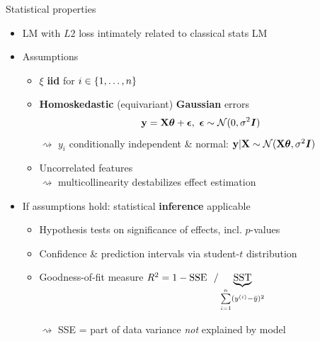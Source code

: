 \documentclass[11pt,compress,t,notes=noshow, xcolor=table]{beamer}
\begin{document}

\begin{vbframe}{Statistical properties}

\begin{itemize}
    \item LM with $L2$ loss intimately related to classical stats LM
    \item Assumptions
    \begin{itemize}
        \item $\xi$ \textbf{iid} for $i \in \{1, \ldots, n\}$
        \item \textbf{Homoskedastic} (equivariant) 
         \textbf{Gaussian} errors
        $$\mathbf{y} = \mathbf{X} \bm{\theta} + \bm{\epsilon}, ~ \bm{\epsilon} \sim 
        \mathcal{N}(0, \sigma^2 \boldsymbol{I})  $$
        $\rightsquigarrow$ $y_i$ conditionally independent \& normal:
        $\mathbf{y} | \mathbf{X} \sim \mathcal{N}(\mathbf{X} \bm{\theta}, \sigma^2 \boldsymbol{I})$
        \item Uncorrelated features \\$\rightsquigarrow$ 
        multicollinearity destabilizes effect estimation 
    \end{itemize}
    \item If assumptions hold: statistical \textbf{inference} applicable
    \begin{itemize}
            \item Hypothesis tests on significance of effects, incl. $p$-values
            \item Confidence \& prediction intervals via student-$t$ 
            distribution
        \item Goodness-of-fit measure
        $R^2 = 1 - \text{SSE} ~~ / \underbrace{\text{SST}}_{
        \sum\limits_{i=1}^n (y^{(i)} - \bar y)^2}$
        
        $\rightsquigarrow$ SSE = part of data variance \textit{not} explained 
        by model
    \end{itemize}
\end{itemize}

\end{vbframe}


\end{document}
